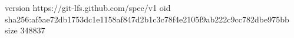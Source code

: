 version https://git-lfs.github.com/spec/v1
oid sha256:af5ae72db1753dc1e1158af847d2b1c3c78f4e2105f9ab222c9cc782dbe975bb
size 348837
